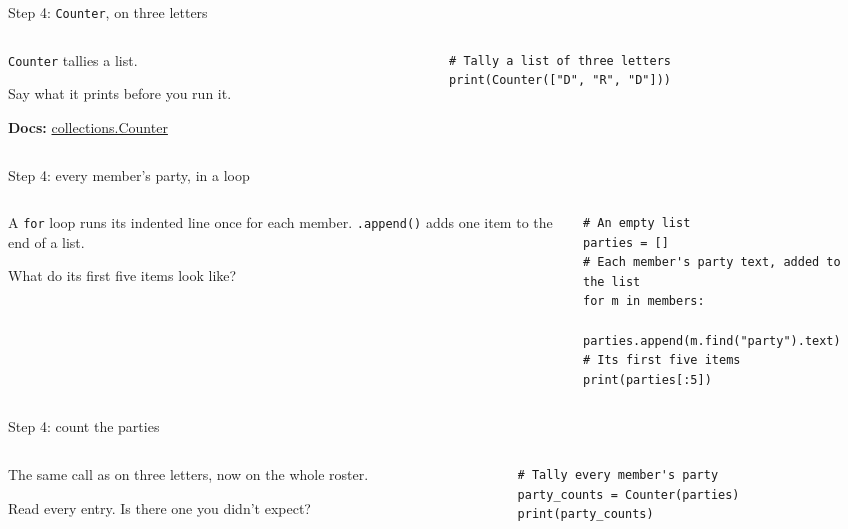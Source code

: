 \documentclass[9pt,aspectratio=169]{beamer}
\begin{document}
\begin{frame}[fragile]{Step 4: \texttt{Counter}, on three letters}
    \begin{columns}[T]
        \begin{column}{0.37\textwidth}
            \texttt{Counter} tallies a list.

            \medskip
            Say what it prints before you run it.

            \medskip
            {\scriptsize\textbf{Docs:} \href{https://docs.python.org/3/library/collections.html\#collections.Counter}{collections.Counter}\par}
        \end{column}
        \begin{column}{0.6\textwidth}
\begin{lstlisting}
# Tally a list of three letters
print(Counter(["D", "R", "D"]))
\end{lstlisting}
        \end{column}
    \end{columns}
\end{frame}

\begin{frame}[fragile]{Step 4: every member's party, in a loop}
    \begin{columns}[T]
        \begin{column}{0.37\textwidth}
            A \texttt{for} loop runs its indented line once for each member. \texttt{.append()} adds one item to the end of a list.

            \medskip
            What do its first five items look like?
        \end{column}
        \begin{column}{0.6\textwidth}
\begin{lstlisting}
# An empty list
parties = []
# Each member's party text, added to the list
for m in members:
    parties.append(m.find("party").text)
# Its first five items
print(parties[:5])
\end{lstlisting}
        \end{column}
    \end{columns}
\end{frame}

\begin{frame}[fragile]{Step 4: count the parties}
    \begin{columns}[T]
        \begin{column}{0.37\textwidth}
            The same call as on three letters, now on the whole roster.

            \medskip
            Read every entry. Is there one you didn't expect?
        \end{column}
        \begin{column}{0.6\textwidth}
\begin{lstlisting}
# Tally every member's party
party_counts = Counter(parties)
print(party_counts)
\end{lstlisting}
        \end{column}
    \end{columns}
\end{frame}
\end{document}
